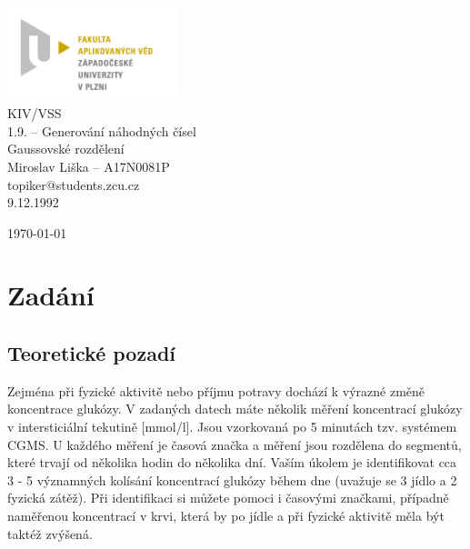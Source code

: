 \documentclass{article}
\begin{document}
	
	
	
	
	\begin{titlepage}	
		\begin{center}
			\includegraphics[width=5cm]{logo.jpg}\\[3.5cm]
			{\Huge KIV/VSS}\\[0.5cm]
			{\Large 1.9. – Generování náhodných čísel}\\[0.5cm]
			{\large  Gaussovské rozdělení}\\[4.5cm]
			{\large  Miroslav Liška – A17N0081P}\\[0.5cm]
			{\large  topiker@students.zcu.cz}\\[0.5cm]
			{\large   9.12.1992}\\[0.5cm]
			\vfill
			
			{\large \today}
			
		\end{center}
	\end{titlepage}
	
	
	
	\section{Zadání} %
	\setcounter{page}{1}
	
	\subsection{Teoretické pozadí}
	Zejména při fyzické aktivitě nebo příjmu potravy dochází k výrazné změně koncentrace glukózy.
	V zadaných datech máte několik měření koncentrací glukózy v intersticiální tekutině [mmol/l].
	Jsou vzorkovaná po 5 minutách tzv. systémem CGMS. 
	U každého měření je časová značka a měření jsou rozdělena do segmentů, které trvají od několika hodin do několika dní. 
	Vaším úkolem je identifikovat cca 3 - 5 významných kolísání koncentrací glukózy během dne (uvažuje se 3 jídlo a 2 fyzická zátěž). 
	Při identifikaci si můžete pomoci i časovými značkami, případně naměřenou koncentrací v krvi, která by po jídle a při fyzické aktivitě měla být taktéž zvýšená.
	
\end{document}
